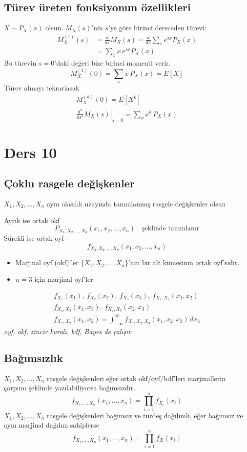 \documentclass[11pt,a4paper]{article}
\begin{document}
\subsection{Türev üreten fonksiyonun özellikleri}
$X\sim P_X(x)$ olsun. $M_X(s)$'nin $s$'ye göre birinci dereceden türevi:
\begin{align*}
  M_X^{(1)}(s) &= \frac{d}{ds}M_X(s)=\frac{d}{ds}\sum_{x}e^{sx}P_X(x)\\
  &= \sum_{x}x\,e^{sx}P_X(x)
\end{align*}
Bu türevin $s=0$'daki değeri bize birinci momenti verir.
\[ M_X^{(1)}(0)=\sum_{x}x\,P_X(x)=E[X] \]
Türev almayı tekrarlasak
\begin{gather*}
  M_X^{(k)}(0)=E[X^k]\\
  \left.\frac{d^k}{ds^k}M_X(s)\right|_{s=0}=\sum_{x}x^k\,P_X(x)
\end{gather*}

\section{Ders 10}
\subsection{Çoklu rasgele değişkenler}
$X_1,X_2,\ldots,X_n$ aynı olasılık uzayında tanımlanmış rasgele değişkenler olsun

Ayrık ise ortak okf
\[ P_{X_1,X_2,\ldots,X_n}(x_1,x_2,\ldots,x_n)\quad\text{şeklinde tanımlanır} \]
Sürekli ise ortak oyf
\[ f_{X_1,X_2,\ldots,X_n}(x_1,x_2,\ldots,x_n) \]
\begin{itemize}
  \item Marjinal oyf (okf)'ler $\{X_1,X_2,\ldots,X_n\}$'nin bir alt kümesinin ortak oyf'sidir.
  \item $n=3$ için marjinal oyf'ler
\end{itemize}
\begin{gather*}
  f_{X_1}(x_1),\ f_{X_2}(x_2),\ f_{X_3}(x_3),\ f_{X_1,X_2}(x_1,x_2)\\
  f_{X_1,X_3}(x_1,x_3),\ f_{X_2,X_3}(x_2,x_3)\\
  f_{X_1,X_2}(x_1,x_2)=\int_{-\infty}^{\infty}f_{X_1,X_2,X_3}(x_1,x_2,x_3)\,dx_3
\end{gather*}
\textit{oyf, okf, zincir kuralı, bdf, Bayes de çalışır}

\subsection{Bağımsızlık}
$X_1,X_2,\ldots,X_n$ rasgele değişkenleri eğer ortak okf/oyf/bdf'leri marjinallerin çarpımı şeklinde yazılabiliyorsa bağımsızdır.
\[ f_{X_1,\ldots,X_n}(x_1,\ldots,x_n)=\prod_{i=1}^{n}f_{X_i}(x_i) \]
$X_1,X_2,\ldots,X_n$ rasgele değişkenleri bağımsız ve türdeş dağılımlı, eğer bağımsız ve aynı marjinal dağılım sahiplerse
\[ f_{X_1,\ldots,X_n}(x_1,\ldots,x_n)=\prod_{i=1}^{n}f_X(x_i) \]
\end{document}
